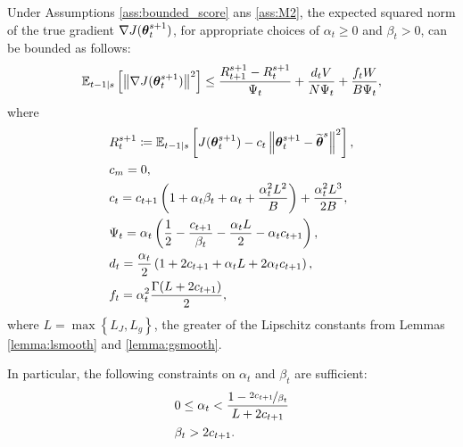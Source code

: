 \begin{lemma}\label{lemma:aux1}
	Under Assumptions \ref{ass:bounded_score} ans \ref{ass:M2}, the expected squared norm of the true gradient $\gradJ{\vtheta_t^{s+1}}$, for appropriate choices of $\alpha_t\geq0$ and $\beta_t>0$, can be bounded as follows:
	\[
	\Ets[t-1]{\norm[]{\gradJ{\vtheta_t^{s+1}}}^2} \leq
	\frac{R_{t+1}^{s+1} - R_t^{s+1}}{\Psi_t} + \frac{d_tV}{N\Psi_t}
	+\frac{f_tW}{B\Psi_t},
	\]
	where
	\begin{align*}
	&R_t^{s+1}\coloneqq \Ets[t-1]{J(\vtheta_t^{s+1}) - c_t\norm[]{\vtheta_t^{s+1}-\wt{\vtheta}^s}^2}, \\
	&c_{m} = 0, \\
	&c_t = c_{t+1}\left(1+\alpha_t\beta_t+\alpha_t+\frac{\alpha_t^2L^2}{B}\right)+\frac{\alpha_t^2L^3}{2B}, \\
	&\Psi_t = \alpha_t\left(\frac{1}{2}-\frac{c_{t+1}}{\beta_t}-\frac{\alpha_tL}{2}-\alpha_tc_{t+1}\right), \\
	&d_t = \frac{\alpha_t}{2}\left(1+2c_{t+1}+\alpha_tL+2\alpha_tc_{t+1}\right), \\
	&f_t = \alpha_t^2\frac{\Gamma(L+2c_{t+1})}{2},
	\end{align*}
	where $L=\max\left\{L_J,L_g\right\}$, \ie the greater of the Lipschitz constants from Lemmas \ref{lemma:lsmooth} and \ref{lemma:gsmooth}.
	
	In particular, the following constraints on $\alpha_t$ and $\beta_t$ are sufficient:
	\begin{align*}
	&0\leq\alpha_t < \frac{1-\nicefrac{2c_{t+1}}{\beta_t}}{L+2c_{t+1}} \\
	&\beta_t > 2c_{t+1}.
	\end{align*}
\end{lemma}
